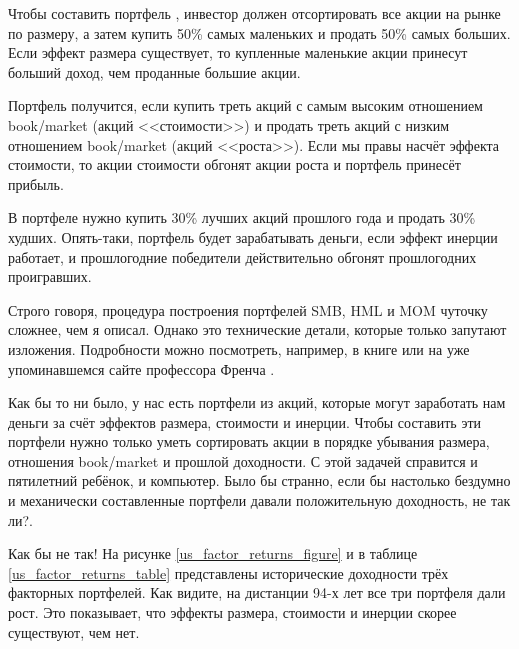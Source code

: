 Чтобы составить портфель , инвестор должен отсортировать все акции на рынке по размеру, а затем купить 50\% самых маленьких и продать 50\% самых больших. Если эффект размера существует, то купленные маленькие акции принесут больший доход, чем проданные большие акции.

Портфель  получится, если купить треть акций с самым высоким отношением book/market (акций <<стоимости>>) и продать треть акций с низким отношением book/market (акций <<роста>>). Если мы правы насчёт эффекта стоимости, то акции стоимости обгонят акции роста и портфель принесёт прибыль.

В портфеле  нужно купить 30\% лучших акций прошлого года и продать 30\% худших. Опять-таки, портфель будет зарабатывать деньги, если эффект инерции работает, и прошлогодние победители действительно обгонят прошлогодних проигравших.

Строго говоря, процедура построения портфелей SMB, HML и MOM чуточку сложнее, чем я описал. Однако это технические детали, которые только запутают изложения. Подробности можно посмотреть, например, в книге \cite[ch.~9--11]{bali2016empirical} или на уже упоминавшемся сайте профессора Френча \cite{kennethFrench}.

Как бы то ни было, у нас есть портфели из акций, которые могут заработать нам деньги за счёт эффектов размера, стоимости и инерции. Чтобы составить эти портфели нужно только уметь сортировать акции в порядке убывания размера, отношения book/market и прошлой доходности. С этой задачей справится и пятилетний ребёнок, и компьютер. Было бы странно, если бы настолько бездумно и механически составленные портфели давали положительную доходность, не так ли?.

Как бы не так! На рисунке \ref{us_factor_returns_figure} и в таблице \ref{us_factor_returns_table} представлены исторические доходности трёх факторных портфелей. Как видите, на дистанции 94-х лет все три портфеля дали рост. Это показывает, что эффекты размера, стоимости и инерции скорее существуют, чем нет.

